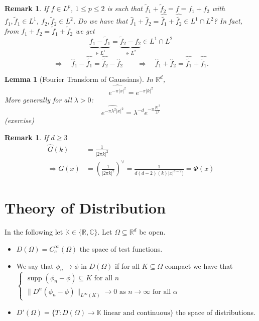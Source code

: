 \documentclass{report}
\theoremstyle{tommy}
\newtheorem{lem}[defn]{Lemma}
\newtheorem{rem}[defn]{Remark}
\newcommand{\supp}{\operatorname{supp}}
\newcommand{\Rd}{\mathbb{R}^d}
\begin{document}
  \begin{rem}
    If \(f \in L^p\), \(1 \le p \le 2\) is such that \(\tilde f_1 + \tilde f_2 = f = f_1 + f_2\) with \(f_1, \tilde f_1 \in L^1\), \(f_2, \tilde f_2 \in L^2\). Do we have that \(\hat f_1 + \hat f_2 = \widehat{\tilde{f_1}} + \widehat{\tilde{f_2}} \in L^1 \cap L^2\)? In fact, from \(f_1 + f_2 = \tilde f_1 + \tilde f_2\) we get 
      \[\underbrace{f_1 - \tilde f_1}_{\in L^1} = \underbrace{\tilde f_2 - f_2}_{\in L^2} \in L^1 \cap L^2\]
      \[\Rightarrow \quad \hat f_1 - \widehat{\tilde{f_1}} = \widehat{\tilde{f_2}}- \hat f_2 \qquad
      \Rightarrow \quad \hat f_1 + \hat f_2 = \widehat{\tilde{f_1}} + \widehat{\tilde{f_1}}.\]
  \end{rem}
  
  \begin{lem}[Fourier Transform of Gaussians] In \(\Rd\),
    \[\widehat{e^{- \pi |x|^2}} = e^{- \pi |k|^2}\]
    More generally for all \(\lambda > 0\):
    \[\widehat{e^{- \pi \lambda^2 |x|^2}} = \lambda^{-d} e^{-\pi \frac{|k|^2}{\lambda^2}}\]
    (exercise)
  \end{lem}

  
  \begin{rem}
    If \(d \ge 3\)
    \begin{align*}
      \hat G(k) 
      &= \frac{1}{|2 \pi k|^2}  \\
      \Rightarrow G(x) 
      &= \left(\frac{1}{|2 \pi k|^2}\right)^\lor
      = \frac{1}{d(d-2)(k) |x|^{d-2})}
      = \Phi(x)
    \end{align*}
  \end{rem}

  \section{Theory of Distribution}
  In the following let \(\mathbb{K} \in \{\mathbb{R}, \mathbb{C}\}\). Let \(\Omega \subseteq \mathbb{R}^d\) be open.
  \begin{itemize}
    \item \(D(\Omega) = C_c^\infty(\Omega)\) the space of test functions.
    \item We say that \(\phi_n \to \phi\) in \(D(\Omega)\) if for all \(K\subseteq \Omega\) compact we have that \(\begin{cases}
      \supp(\phi_n - \phi) \subseteq K \text{ for all } n \\
      \|D^\alpha(\phi_n - \phi)\|_{L^\infty(K)} \to 0 \text{ as } n \to \infty \text{ for all } \alpha
    \end{cases}\)
    \item \(D'(\Omega) = \{T: D(\Omega) \to \mathbb{K} \text{ linear and continuous}\}\) the space of distributions.
  \end{itemize}
\end{document}
